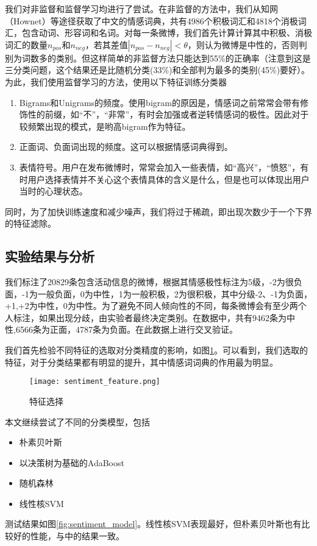 我们对非监督和监督学习均进行了尝试。在非监督的方法中，我们从知网（Hownet）等途径获取了中文的情感词典，共有4986个积极词汇和4818个消极词汇，包含动词、形容词和名词。对每一条微博，我们首先计算计算其中积极、消极词汇的数量$n_{pos}$和$n_{neg}$，若其差值$|n_{pos}-n_{neg}|<\theta$，则认为微博是中性的，否则判别为词数多的类别。但这样简单的非监督方法只能达到55\%的正确率（注意到这是三分类问题，这个结果还是比随机分类(33\%)和全部判为最多的类别(45\%)要好）。为此，我们使用监督学习的方法，使用以下特征训练分类器

\begin{enumerate}
\item Bigrams和Unigrams的频度。使用bigram的原因是，情感词之前常常会带有修饰性的前缀，如``不''，``非常''，有时会加强或者逆转情感词的极性。因此对于较频繁出现的模式，是哟高bigram作为特征。
\item 正面词、负面词出现的频度。这可以根据情感词典得到。
\item 表情符号。用户在发布微博时，常常会加入一些表情，如``高兴''，``愤怒''，有时用户选择表情并不关心这个表情具体的含义是什么，但是也可以体现出用户当时的心理状态。
\end{enumerate}
同时，为了加快训练速度和减少噪声，我们将过于稀疏，即出现次数少于一个下界的特征滤除。

\subsection{实验结果与分析}
我们标注了20829条包含活动信息的微博，根据其情感极性标注为5级，-2为很负面，-1为一般负面，0为中性，1为一般积极，2为很积极，其中分级-2、-1为负面，+1,+2为中性，0为中性。为了避免不同人倾向性的不同，每条微博会有至少两个人标注，如果出现分歧，由实验者最终决定类别。在数据中，共有9462条为中性,6566条为正面，4787条为负面。在此数据上进行交叉验证。

我们首先检验不同特征的选取对分类精度的影响，如图\ref{fig:sentiment_feature}。可以看到，我们选取的特征，对于分类结果都有明显的提升，其中情感词词典的作用最为明显。
\begin{figure}[!h]
\centering
\texttt{[image: sentiment\_feature.png]}
\caption{特征选择}
\label{fig:sentiment_feature}
\end{figure}

本文继续尝试了不同的分类模型，包括
\begin{itemize}
\item 朴素贝叶斯
\item 以决策树为基础的AdaBoost
\item 随机森林
\item 线性核SVM
\end{itemize}
测试结果如图\ref{fig:sentiment_model}。线性核SVM表现最好，但朴素贝叶斯也有比较好的性能，与\cite{pang2002thumbs}中的结果一致。

